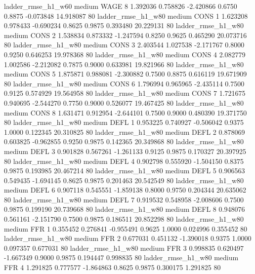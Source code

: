     ladder_rmse_h1_w60     medium     WAGE                 8  1.392036 0.758826 -2.420866 0.6750 0.8875 -0.073848   14.918087 80
    ladder_rmse_h1_w80     medium     CONS                 1  1.623208 0.978433 -0.690234 0.8625 0.9875  0.393480   20.229131 80
    ladder_rmse_h1_w80     medium     CONS                 2  1.538834 0.873332 -1.247594 0.8250 0.9625  0.465290   20.073716 80
    ladder_rmse_h1_w80     medium     CONS                 3  2.403544 1.027538 -2.171767 0.8000 0.9250  0.646253   19.978368 80
    ladder_rmse_h1_w80     medium     CONS                 4  2.082779 1.002586 -2.212082 0.7875 0.9000  0.633981   19.821966 80
    ladder_rmse_h1_w80     medium     CONS                 5  1.875871 0.988081 -2.300882 0.7500 0.8875  0.616119   19.671909 80
    ladder_rmse_h1_w80     medium     CONS                 6  1.796994 0.965965 -2.435114 0.7500 0.9125  0.574929   19.564958 80
    ladder_rmse_h1_w80     medium     CONS                 7  1.721675 0.940695 -2.544270 0.7750 0.9000  0.526077   19.467425 80
    ladder_rmse_h1_w80     medium     CONS                 8  1.631471 0.912954 -2.644101 0.7500 0.9000  0.480390   19.371750 80
    ladder_rmse_h1_w80     medium     DEFL                 1  0.953225 0.740927 -0.506042 0.9375 1.0000  0.122345   20.310825 80
    ladder_rmse_h1_w80     medium     DEFL                 2  0.878069 0.603825 -0.962855 0.9250 0.9875  0.142365   20.349868 80
    ladder_rmse_h1_w80     medium     DEFL                 3  0.901828 0.567261 -1.261133 0.9125 0.9875  0.170327   20.397925 80
    ladder_rmse_h1_w80     medium     DEFL                 4  0.902798 0.555920 -1.504150 0.8375 0.9875  0.193985   20.467214 80
    ladder_rmse_h1_w80     medium     DEFL                 5  0.906563 0.549435 -1.694145 0.8625 0.9875  0.201463   20.542549 80
    ladder_rmse_h1_w80     medium     DEFL                 6  0.907118 0.545551 -1.859138 0.8000 0.9750  0.204344   20.635062 80
    ladder_rmse_h1_w80     medium     DEFL                 7  0.919532 0.548958 -2.008606 0.7500 0.9875  0.199190   20.739668 80
    ladder_rmse_h1_w80     medium     DEFL                 8  0.948076 0.561161 -2.151790 0.7500 0.9875  0.186511   20.852298 80
    ladder_rmse_h1_w80     medium      FFR                 1  0.355452 0.276841 -0.955491 0.9625 1.0000  0.024996    0.355452 80
    ladder_rmse_h1_w80     medium      FFR                 2  0.677031 0.451132 -1.390018 0.9375 1.0000  0.097357    0.677031 80
    ladder_rmse_h1_w80     medium      FFR                 3  0.998835 0.620497 -1.667349 0.9000 0.9875  0.194447    0.998835 80
    ladder_rmse_h1_w80     medium      FFR                 4  1.291825 0.777577 -1.864863 0.8625 0.9875  0.300175    1.291825 80
